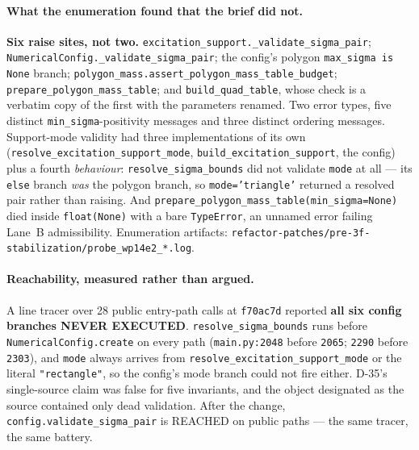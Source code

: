 \documentclass[
  10pt,
]{article}
\begin{document}
\paragraph{What the enumeration found that the brief did not.}
\textbf{Six raise sites, not two.} \texttt{excitation\_support.\_validate\_sigma\_pair}; \texttt{NumericalConfig.\_validate\_sigma\_pair}; the config's polygon \texttt{max\_sigma is None} branch; \texttt{polygon\_mass.assert\_polygon\_mass\_table\_budget}; \texttt{prepare\_polygon\_mass\_table}; and \texttt{build\_quad\_table}, whose check is a verbatim copy of the first with the parameters renamed. Two error types, five distinct \texttt{min\_sigma}-positivity messages and three distinct ordering messages. Support-mode validity had three implementations of its own (\texttt{resolve\_excitation\_support\_mode}, \texttt{build\_excitation\_support}, the config) plus a fourth \emph{behaviour}: \texttt{resolve\_sigma\_bounds} did not validate \texttt{mode} at all --- its \texttt{else} branch \emph{was} the polygon branch, so \texttt{mode='triangle'} returned a resolved pair rather than raising. And \texttt{prepare\_polygon\_mass\_table(min\_sigma=None)} died inside \texttt{float(None)} with a bare \texttt{TypeError}, an unnamed error failing Lane~B admissibility. Enumeration artifacts: \texttt{refactor-patches/\allowbreak{}pre-3f-stabilization/\allowbreak{}probe\_wp14e2\_*.log}.

\paragraph{Reachability, measured rather than argued.}
A line tracer over 28 public entry-path calls at \texttt{f70ac7d} reported \textbf{all six config branches NEVER EXECUTED}. \texttt{resolve\_sigma\_bounds} runs before \texttt{NumericalConfig.create} on every path (\texttt{main.py:2048} before \texttt{2065}; \texttt{2290} before \texttt{2303}), and \texttt{mode} always arrives from \texttt{resolve\_excitation\_support\_mode} or the literal \texttt{"rectangle"}, so the config's mode branch could not fire either. D-35's single-source claim was false for five invariants, and the object designated as the source contained only dead validation. After the change, \texttt{config.validate\_sigma\_pair} is REACHED on public paths --- the same tracer, the same battery.
\end{document}

